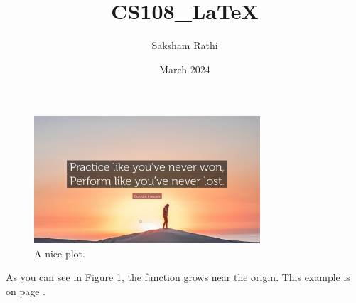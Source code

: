 \documentclass{article}
\title{CS108\_LaTeX}
\author{Saksham Rathi}
\date{March 2024}
\begin{document}
\maketitle

\begin{figure}[h]
    \centering
    \includegraphics[width=0.75\textwidth]{quote.jpg}
    \caption{A nice plot.}
    \label{fig:mesh1}
\end{figure}

As you can see in Figure \ref{fig:mesh1}, the function grows near the origin. This example is on page \pageref{fig:mesh1}.

\end{document}

